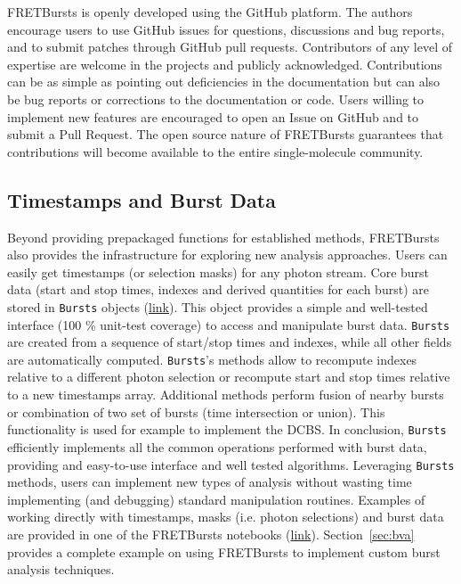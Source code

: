 \documentclass[10pt,letterpaper]{article}
\begin{document}
FRETBursts is openly developed using the GitHub platform.
The authors encourage users to use GitHub issues for questions, discussions
and bug reports, and to submit patches through GitHub pull requests.
Contributors of any level of expertise are welcome in the projects
and publicly acknowledged.
Contributions can be as simple as pointing out deficiencies in the
documentation but can also be bug reports or corrections to
the documentation or code. Users willing to implement
new features are encouraged to open an Issue on GitHub and to submit
a Pull Request. The open source nature of FRETBursts guarantees that
contributions will become available to the entire single-molecule
community.


\subsection{Timestamps and Burst Data}
\label{sec:burststimes}

Beyond providing prepackaged functions for established methods,
FRETBursts also provides the infrastructure for exploring new analysis approaches.
Users can easily get timestamps (or selection masks) for any photon stream.
Core burst data (start and stop times, indexes
and derived quantities for each burst) are stored in \verb|Bursts| objects
(\href{http://fretbursts.readthedocs.org/en/latest/burstsearch.html}{link}).
This object provides a simple and well-tested interface (100 \% unit-test coverage)
to access and manipulate burst data. \verb|Bursts| are created from a sequence of start/stop
times and indexes, while all other fields are automatically
computed. \verb|Bursts|'s methods allow to recompute indexes relative to a different photon
selection or recompute start and stop times relative to a new timestamps array.
Additional methods perform fusion of nearby bursts or combination of two set of bursts
(time intersection or union). This functionality is used for example to implement
the DCBS.
In conclusion, \verb|Bursts| efficiently implements all the common operations performed
with burst data, providing and easy-to-use interface and well tested algorithms.
Leveraging \verb|Bursts| methods, users can implement new types of analysis without
wasting time implementing (and debugging) standard manipulation routines.
Examples of working directly with timestamps, masks (i.e. photon selections) and
burst data are provided in one of the FRETBursts notebooks (\href{http://nbviewer.jupyter.org/github/tritemio/FRETBursts_notebooks/blob/master/notebooks/Example%20-%20Working%20with%20timestamps%20and%20bursts.ipynb}{link}).
Section~\ref{sec:bva} provides a complete example on using FRETBursts to implement 
custom burst analysis techniques.
\end{document}
